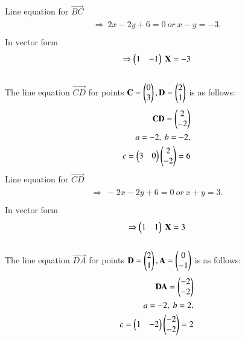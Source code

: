 \documentclass[journal,12pt,twocolumn]{IEEEtran}
\begin{document}
Line equation for $\vec{BC}$
\begin{align}
\begin{split}
\Rightarrow\ 2x-2y+6=0 \ or \ x-y=-3. \\
\end{split}
\end{align}
In vector form
\begin{align}
\begin{split}
\Rightarrow \begin{pmatrix}1&-1\end{pmatrix}\ \mathbf{X}=-3
\end{split}
\end{align}
\\
The line equation $\vec{CD}$ for points $\mathbf{C}=\begin{pmatrix}0\\3\end{pmatrix},\mathbf{D} = \begin{pmatrix}2\\1\end{pmatrix}$ is as follows:
\\
\begin{align}
\begin{split}
\mathbf{CD} = \begin{pmatrix}2\\-2\end{pmatrix}\\
a=-2,\ b=-2,\\
c=\begin{pmatrix}3 & 0\end{pmatrix} \begin{pmatrix}2\\-2\end{pmatrix}=6\\
\end{split}
\end{align}
Line equation for $\vec{CD}$
\begin{align}
\begin{split}
 \Rightarrow\ -2x-2y+6=0 \ or \ x+y=3. \\
\end{split}
\end{align}
In vector form
\begin{align}
\begin{split}
\Rightarrow \begin{pmatrix}1&1\end{pmatrix}\ \mathbf{X}=3
\end{split}
\end{align}
\\
The line equation $\vec{DA}$ for points $\mathbf{D} = \begin{pmatrix}2\\1\end{pmatrix}, \mathbf{A} = \begin{pmatrix}0\\-1\end{pmatrix}$ is as follows:\\
\begin{align}
\begin{split}
\mathbf{DA} = \begin{pmatrix}-2\\-2\end{pmatrix}\\
a=-2,\ b=2,\\
c=\begin{pmatrix}1 & -2\end{pmatrix} \begin{pmatrix}-2\\-2\end{pmatrix}=2\\
\end{split}
\end{align}
\end{document}
